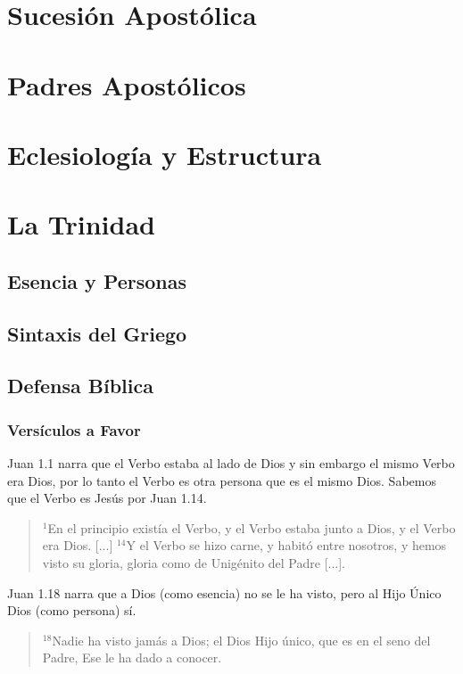 \documentclass[12pt]{report}
\begin{document}
	\section{Sucesión Apostólica}
	\section{Padres Apostólicos}
	\section{Eclesiología y Estructura}
	
	
	\section{La Trinidad}
	\subsection{Esencia y Personas}
	\subsection{Sintaxis del Griego}
	
	\subsection{Defensa Bíblica}
	\subsubsection{Versículos a Favor}
	
	\point Juan 1.1 narra que el Verbo estaba al lado de Dios y sin embargo el mismo Verbo era Dios, por lo tanto el Verbo es otra persona que es el mismo Dios. Sabemos que el Verbo es Jesús por Juan 1.14.
	\begin{quote}
		$^1$En el principio existía el Verbo, y el Verbo estaba junto a Dios, y el Verbo era Dios. [...] $^{14}$Y el Verbo se hizo carne, y habitó entre nosotros, y hemos visto su gloria, gloria como de Unigénito del Padre [...].
	\end{quote}
	
	\point Juan 1.18 narra que a Dios (como esencia) no se le ha visto, pero al Hijo Único Dios (como persona) sí.
	\begin{quote}
		$^{18}$Nadie ha visto jamás a Dios; el Dios Hijo único, que es en el seno del Padre, Ese le ha dado a conocer.
	\end{quote}
	
\end{document}
